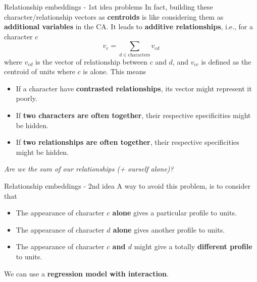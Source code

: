 \documentclass[10pt]{beamer}
\newcommand{\imp}[1]{\textbf{\color{cyan}#1}}
\begin{document}
	
	\begin{frame}{Relationship embeddings - 1st idea problems}
		In fact, building these character/relationship vectors as \imp{centroids} is like considering them as \imp{additional variables} in the CA. It leads to \imp{additive relationships}, i.e., for a character $c$
		$$
		v_{c} = \sum_{d \in \text{characters}} v_{cd}
		$$
		where $v_{cd}$ is the vector of relationship between $c$ and $d$, and $v_{cc}$ is defined as the centroid of units where $c$ is alone. This means
		\begin{itemize}
			\item If a character have \imp{contrasted relationships}, its vector might represent it poorly.
			\item If \imp{two characters are often together}, their respective specificities might be hidden.
			\item If \imp{two relationships are often together}, their respective specificities might be hidden.
		\end{itemize}
		\emph{Are we the sum of our relationships (+ ourself alone)?} 
	\end{frame}
	
	
	\begin{frame}{Relationship embeddings - 2nd idea}
		A way to avoid this problem, is to consider that
		\begin{itemize}
			\item The appearance of character \imp{$c$ alone} gives a particular profile to units.
			\item The appearance of character \imp{$d$ alone} gives another profile to units.
			\item The appearance of character \imp{$c$ and $d$} might give a totally \imp{different profile} to units.
		\end{itemize}
		We can use a \imp{regression model with interaction}.
	\end{frame}
	
	
\end{document}
